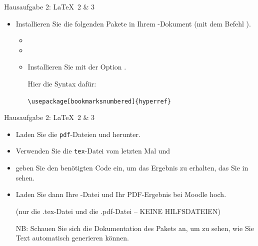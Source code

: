 \begin{frame}[fragile]{Hausaufgabe 2: \LaTeX\ 2 \& 3}

\begin{itemize}
	
	\item Installieren Sie die folgenden Pakete in Ihrem -Dokument (mit dem Befehl ).
	
	\begin{itemize}
		\item {} 
		\item {}
		\item {}
		
		Installieren Sie  mit der Option . 
		
		Hier die Syntax dafür:
		
		\lstinline|\usepackage[bookmarksnumbered]{hyperref}|
		
	\end{itemize}

\end{itemize}

\end{frame}


\begin{frame}{Hausaufgabe 2: \LaTeX\ 2 \& 3}

\begin{itemize}

	\item Laden Sie die \texttt{pdf}-Dateien  und  herunter.
	
	\item Verwenden Sie die \texttt{tex}-Datei  vom letzten Mal und
	
	\item geben Sie den benötigten Code ein, um das Ergebnis zu erhalten, das Sie in  sehen.
	
	\item Laden Sie dann Ihre -Datei und Ihr PDF-Ergebnis bei Moodle hoch. 
	
	(nur die \alert{.tex-Datei} und die \alert{.pdf-Datei} -- KEINE HILFSDATEIEN)
	
	\item[NB:] Schauen Sie sich die Dokumentation des Pakets  an, um zu sehen, wie Sie Text automatisch generieren können.
	
\end{itemize}

\end{frame}


